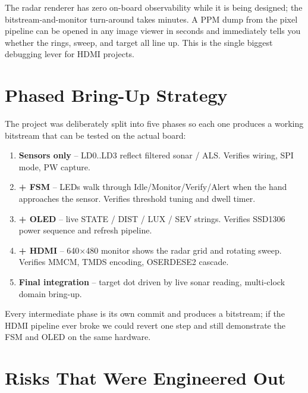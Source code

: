 \documentclass[11pt,a4paper]{article}
\begin{document}
The radar renderer has zero on-board observability while it is being
designed; the bitstream-and-monitor turn-around takes minutes.  A PPM
dump from the pixel pipeline can be opened in any image viewer in
seconds and immediately tells you whether the rings, sweep, and target
all line up.  This is the single biggest debugging lever for HDMI
projects.

\section{Phased Bring-Up Strategy}

The project was deliberately split into five phases so each one
produces a working bitstream that can be tested on the actual board:

\begin{enumerate}
  \item \textbf{Sensors only} -- LD0..LD3 reflect filtered sonar / ALS.
        Verifies wiring, SPI mode, PW capture.
  \item \textbf{+ FSM} -- LEDs walk through Idle/Monitor/Verify/Alert
        when the hand approaches the sensor.  Verifies threshold
        tuning and dwell timer.
  \item \textbf{+ OLED} -- live STATE / DIST / LUX / SEV strings.
        Verifies SSD1306 power sequence and refresh pipeline.
  \item \textbf{+ HDMI} -- 640$\times$480 monitor shows the radar
        grid and rotating sweep.  Verifies MMCM, TMDS encoding,
        OSERDESE2 cascade.
  \item \textbf{Final integration} -- target dot driven by live
        sonar reading, multi-clock domain bring-up.
\end{enumerate}

Every intermediate phase is its own commit and produces a bitstream;
if the HDMI pipeline ever broke we could revert one step and still
demonstrate the FSM and OLED on the same hardware.

\section{Risks That Were Engineered Out}
\end{document}
